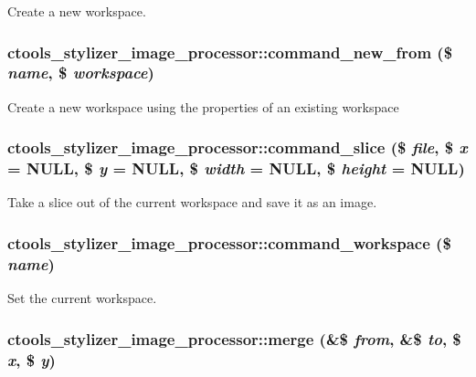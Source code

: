 Create a new workspace. \hypertarget{classctools__stylizer__image__processor_a596478b51c878b732f2ad7512bc566df}{
\subsubsection[{command\_\-new\_\-from}]{\setlength{\rightskip}{0pt plus 5cm}ctools\_\-stylizer\_\-image\_\-processor::command\_\-new\_\-from (\$ {\em name}, \/  \$ {\em workspace})}}
\label{classctools__stylizer__image__processor_a596478b51c878b732f2ad7512bc566df}
Create a new workspace using the properties of an existing workspace \hypertarget{classctools__stylizer__image__processor_a55f0e3264a997323ff12a50a26895238}{
\subsubsection[{command\_\-slice}]{\setlength{\rightskip}{0pt plus 5cm}ctools\_\-stylizer\_\-image\_\-processor::command\_\-slice (\$ {\em file}, \/  \$ {\em x} = {\ttfamily NULL}, \/  \$ {\em y} = {\ttfamily NULL}, \/  \$ {\em width} = {\ttfamily NULL}, \/  \$ {\em height} = {\ttfamily NULL})}}
\label{classctools__stylizer__image__processor_a55f0e3264a997323ff12a50a26895238}
Take a slice out of the current workspace and save it as an image. \hypertarget{classctools__stylizer__image__processor_ac718322ba340073405bdff291a5fbbf0}{
\subsubsection[{command\_\-workspace}]{\setlength{\rightskip}{0pt plus 5cm}ctools\_\-stylizer\_\-image\_\-processor::command\_\-workspace (\$ {\em name})}}
\label{classctools__stylizer__image__processor_ac718322ba340073405bdff291a5fbbf0}
Set the current workspace. \hypertarget{classctools__stylizer__image__processor_ad1e623018b023fc6cc484759778b4bbd}{
\subsubsection[{merge}]{\setlength{\rightskip}{0pt plus 5cm}ctools\_\-stylizer\_\-image\_\-processor::merge (\&\$ {\em from}, \/  \&\$ {\em to}, \/  \$ {\em x}, \/  \$ {\em y})}}
